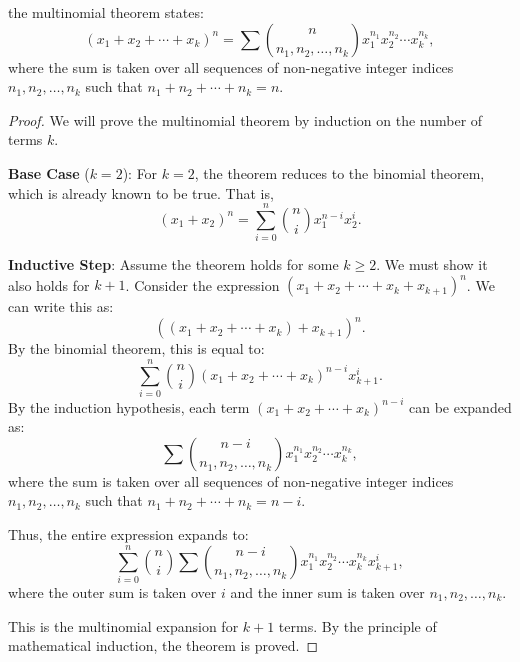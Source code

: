         \begin{solution}
                the multinomial theorem states:
                \[
                (x_1 + x_2 + \cdots + x_k)^n = \sum \binom{n}{n_1, n_2, \ldots, n_k} x_1^{n_1} x_2^{n_2} \cdots x_k^{n_k},
                \]
                where the sum is taken over all sequences of non-negative integer indices $n_1, n_2, \ldots, n_k$ such that $n_1 + n_2 + \cdots + n_k = n$.
                
            \begin{proof}
                We will prove the multinomial theorem by induction on the number of terms $k$.
                
                \textbf{Base Case} ($k=2$):
                For $k=2$, the theorem reduces to the binomial theorem, which is already known to be true. That is,
                \[
                (x_1 + x_2)^n = \sum_{i=0}^{n} \binom{n}{i} x_1^{n-i} x_2^i.
                \]
                
                \textbf{Inductive Step}:
                Assume the theorem holds for some $k \geq 2$. We must show it also holds for $k+1$. Consider the expression $(x_1 + x_2 + \cdots + x_k + x_{k+1})^n$. We can write this as:
                \[
                \left((x_1 + x_2 + \cdots + x_k) + x_{k+1}\right)^n.
                \]
                By the binomial theorem, this is equal to:
                \[
                \sum_{i=0}^{n} \binom{n}{i} (x_1 + x_2 + \cdots + x_k)^{n-i} x_{k+1}^i.
                \]
                By the induction hypothesis, each term $(x_1 + x_2 + \cdots + x_k)^{n-i}$ can be expanded as:
                \[
                \sum \binom{n-i}{n_1, n_2, \ldots, n_k} x_1^{n_1} x_2^{n_2} \cdots x_k^{n_k},
                \]
                where the sum is taken over all sequences of non-negative integer indices $n_1, n_2, \ldots, n_k$ such that $n_1 + n_2 + \cdots + n_k = n-i$.
                
                Thus, the entire expression expands to:
                \[
                \sum_{i=0}^{n} \binom{n}{i} \sum \binom{n-i}{n_1, n_2, \ldots, n_k} x_1^{n_1} x_2^{n_2} \cdots x_k^{n_k} x_{k+1}^i,
                \]
                where the outer sum is taken over $i$ and the inner sum is taken over $n_1, n_2, \ldots, n_k$.
                
                This is the multinomial expansion for $k+1$ terms. By the principle of mathematical induction, the theorem is proved.
            \end{proof}
        \end{solution}


